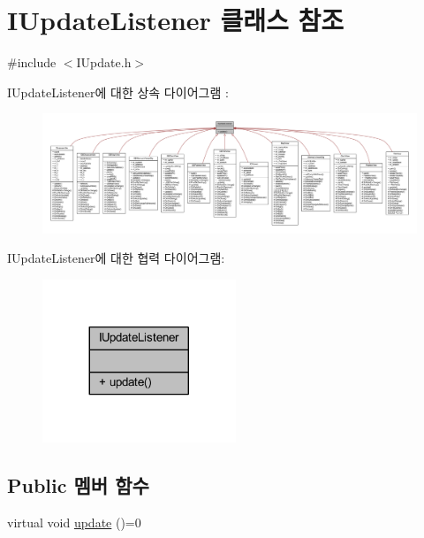 \hypertarget{class_i_update_listener}{}\section{I\+Update\+Listener 클래스 참조}
\label{class_i_update_listener}


{\ttfamily \#include $<$I\+Update.\+h$>$}



I\+Update\+Listener에 대한 상속 다이어그램 \+: \nopagebreak
\begin{figure}[H]
\begin{center}
\leavevmode
\includegraphics[width=350pt]{class_i_update_listener__inherit__graph}
\end{center}
\end{figure}


I\+Update\+Listener에 대한 협력 다이어그램\+:\nopagebreak
\begin{figure}[H]
\begin{center}
\leavevmode
\includegraphics[width=164pt]{class_i_update_listener__coll__graph}
\end{center}
\end{figure}
\subsection*{Public 멤버 함수}
\begin{DoxyCompactItemize}
\item 
virtual void \mbox{\hyperlink{class_i_update_listener_ac03b85f52e858d0bbd08a4984b2cb929}{update}} ()=0
\end{DoxyCompactItemize}


